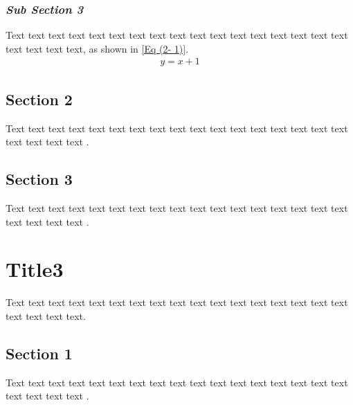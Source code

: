 \documentclass[12pt,a4paper]{article}
\numberwithin{equation}{section}
\begin{document}
{{\subsubsection{\textit{Sub Section 3}}
\hspace{2em}Text text text text text text text text text text text text text text text text text text text text text, as shown in \cref{Eq (2- 1)}.
\begin{align}
    \label{Eq (2- 1)}
    y = x + 1
\end{align}

\subsection{Section 2}
\hspace{2em}Text text text text text text text text text text text text text text text text text text text text text \cite{2}.

\subsection{Section 3}
\hspace{2em}Text text text text text text text text text text text text text text text text text text text text text \cite{3}.


\section{Title3}
\hspace{2em}Text text text text text text text text text text text text text text text text text text text text text.

\subsection{Section 1}
\hspace{2em}Text text text text text text text text text text text text text text text text text text text text text \cite{4}.

}}
\end{document}
